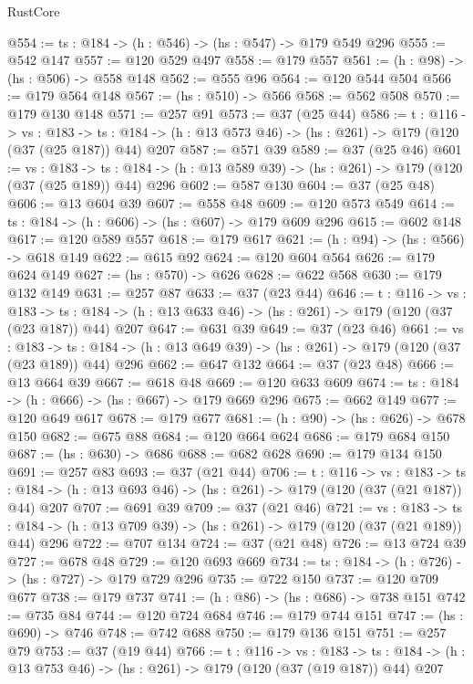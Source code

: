 \begin{lexlean}{RustCore}
\begin{coremodule}
@554 := {ts : @184} -> (h : @546) -> (hs : @547) -> @179 @549 @296
@555 := @542 @147
@557 := @120 @529 @497
@558 := @179 @557
@561 := (h : @98) -> (hs : @506) -> @558 @148
@562 := @555 @96
@564 := @120 @544 @504
@566 := @179 @564 @148
@567 := (hs : @510) -> @566
@568 := @562 @508
@570 := @179 @130 @148
@571 := @257 @91
@573 := @37 (@25 @44)
@586 := {t : @116} ->
  {vs : @183} ->
  {ts : @184} -> (h : @13 @573 @46) -> (hs : @261) -> @179 (@120 (@37 (@25 @187)) @44) @207
@587 := @571 @39
@589 := @37 (@25 @46)
@601 := {vs : @183} ->
  {ts : @184} -> (h : @13 @589 @39) -> (hs : @261) -> @179 (@120 (@37 (@25 @189)) @44) @296
@602 := @587 @130
@604 := @37 (@25 @48)
@606 := @13 @604 @39
@607 := @558 @48
@609 := @120 @573 @549
@614 := {ts : @184} -> (h : @606) -> (hs : @607) -> @179 @609 @296
@615 := @602 @148
@617 := @120 @589 @557
@618 := @179 @617
@621 := (h : @94) -> (hs : @566) -> @618 @149
@622 := @615 @92
@624 := @120 @604 @564
@626 := @179 @624 @149
@627 := (hs : @570) -> @626
@628 := @622 @568
@630 := @179 @132 @149
@631 := @257 @87
@633 := @37 (@23 @44)
@646 := {t : @116} ->
  {vs : @183} ->
  {ts : @184} -> (h : @13 @633 @46) -> (hs : @261) -> @179 (@120 (@37 (@23 @187)) @44) @207
@647 := @631 @39
@649 := @37 (@23 @46)
@661 := {vs : @183} ->
  {ts : @184} -> (h : @13 @649 @39) -> (hs : @261) -> @179 (@120 (@37 (@23 @189)) @44) @296
@662 := @647 @132
@664 := @37 (@23 @48)
@666 := @13 @664 @39
@667 := @618 @48
@669 := @120 @633 @609
@674 := {ts : @184} -> (h : @666) -> (hs : @667) -> @179 @669 @296
@675 := @662 @149
@677 := @120 @649 @617
@678 := @179 @677
@681 := (h : @90) -> (hs : @626) -> @678 @150
@682 := @675 @88
@684 := @120 @664 @624
@686 := @179 @684 @150
@687 := (hs : @630) -> @686
@688 := @682 @628
@690 := @179 @134 @150
@691 := @257 @83
@693 := @37 (@21 @44)
@706 := {t : @116} ->
  {vs : @183} ->
  {ts : @184} -> (h : @13 @693 @46) -> (hs : @261) -> @179 (@120 (@37 (@21 @187)) @44) @207
@707 := @691 @39
@709 := @37 (@21 @46)
@721 := {vs : @183} ->
  {ts : @184} -> (h : @13 @709 @39) -> (hs : @261) -> @179 (@120 (@37 (@21 @189)) @44) @296
@722 := @707 @134
@724 := @37 (@21 @48)
@726 := @13 @724 @39
@727 := @678 @48
@729 := @120 @693 @669
@734 := {ts : @184} -> (h : @726) -> (hs : @727) -> @179 @729 @296
@735 := @722 @150
@737 := @120 @709 @677
@738 := @179 @737
@741 := (h : @86) -> (hs : @686) -> @738 @151
@742 := @735 @84
@744 := @120 @724 @684
@746 := @179 @744 @151
@747 := (hs : @690) -> @746
@748 := @742 @688
@750 := @179 @136 @151
@751 := @257 @79
@753 := @37 (@19 @44)
@766 := {t : @116} ->
  {vs : @183} ->
  {ts : @184} -> (h : @13 @753 @46) -> (hs : @261) -> @179 (@120 (@37 (@19 @187)) @44) @207

\end{coremodule}
\end{lexlean}

